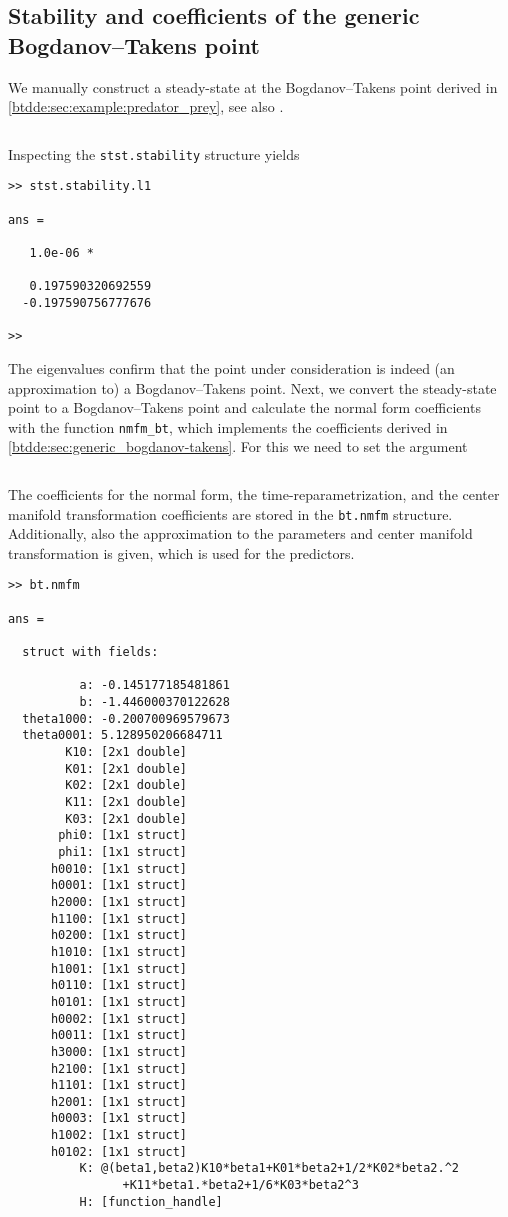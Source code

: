 \subsection{Stability and coefficients of the generic Bogdanov--Takens point}
We manually construct a steady-state at the Bogdanov--Takens point derived in
\cref{btdde:sec:example:predator_prey}, see also \cite{Jiao2021}.
\inputminted[firstline=42, lastline=55]{MATLAB}{\pathToDDEBifToolDemos/predator_prey/predator_prey.m}
Inspecting the \texttt{stst.stability} structure yields
\begin{verbatim}
>> stst.stability.l1

ans =

   1.0e-06 *

   0.197590320692559
  -0.197590756777676

>> 
\end{verbatim}

The eigenvalues confirm that the point under consideration is indeed (an
approximation to) a Bogdanov--Takens point. Next, we convert the steady-state
point to a Bogdanov--Takens point and calculate the normal form coefficients
with the function \texttt{nmfm_bt}, which implements the coefficients
derived in \cref{btdde:sec:generic_bogdanov-takens}. For this we need to set the argument
\inputminted[firstline=57, lastline=60]{MATLAB}{\pathToDDEBifToolDemos/predator_prey/predator_prey.m}
The coefficients for the normal form, the time-reparametrization, and the center
manifold transformation coefficients are stored in the \texttt{bt.nmfm}
structure. Additionally, also the approximation to the parameters and center
manifold transformation is given, which is used for the predictors.
\begin{verbatim}
>> bt.nmfm

ans =

  struct with fields:

          a: -0.145177185481861
          b: -1.446000370122628
  theta1000: -0.200700969579673
  theta0001: 5.128950206684711
        K10: [2x1 double]
        K01: [2x1 double]
        K02: [2x1 double]
        K11: [2x1 double]
        K03: [2x1 double]
       phi0: [1x1 struct]
       phi1: [1x1 struct]
      h0010: [1x1 struct]
      h0001: [1x1 struct]
      h2000: [1x1 struct]
      h1100: [1x1 struct]
      h0200: [1x1 struct]
      h1010: [1x1 struct]
      h1001: [1x1 struct]
      h0110: [1x1 struct]
      h0101: [1x1 struct]
      h0002: [1x1 struct]
      h0011: [1x1 struct]
      h3000: [1x1 struct]
      h2100: [1x1 struct]
      h1101: [1x1 struct]
      h2001: [1x1 struct]
      h0003: [1x1 struct]
      h1002: [1x1 struct]
      h0102: [1x1 struct]
          K: @(beta1,beta2)K10*beta1+K01*beta2+1/2*K02*beta2.^2
                +K11*beta1.*beta2+1/6*K03*beta2^3
          H: [function_handle]
\end{verbatim}

